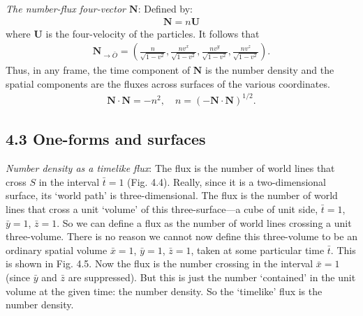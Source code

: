 \documentclass[12pt]{book}
\begin{document}
    \textit{The number-flux four-vector $\mathbf{N}$}: 
    Defined by:
    \begin{align}
        \mathbf{N}=n\mathbf{U} \tag{4.4}
    \end{align}
    where \(\mathbf{U}\) is the four-velocity of the particles. It follows that
    \begin{align}
    \mathbf{N}_{\rightarrow \bar{O}} =
    \left(
    \frac{n}{\sqrt{1 - v^2}},
    \frac{n v^x}{\sqrt{1 - v^2}},
    \frac{n v^y}{\sqrt{1 - v^2}},
    \frac{n v^z}{\sqrt{1 - v^2}}
    \right).
    \tag{4.5}
    \end{align}
    Thus, in any frame, the time component of $\mathbf{N}$ is the number density and the spatial components are the fluxes across surfaces of the various coordinates.
    \begin{align}
    \mathbf{N} \cdot \mathbf{N} = -n^2, \quad n = \left(-\mathbf{N} \cdot \mathbf{N}\right)^{1/2}.     \tag{4.6}
    \end{align}

    \subsection{4.3 One-forms and surfaces}

    \textit{Number density as a timelike flux}: 
    The flux is the number of world lines that cross \(S\) in the interval \(\bar{t} = 1\) (Fig. 4.4). Really, since it is a two-dimensional surface, its ‘world path’ is three-dimensional. The flux is the number of world lines that cross a unit ‘volume’ of this three-surface—a cube of unit side, \(\bar{t} = 1\), \(\bar{y} = 1\), \(\bar{z} = 1\). So we can define a flux as the number of world lines crossing a unit three-volume. There is no reason we cannot now define this three-volume to be an ordinary spatial volume \(\bar{x} = 1\), \(\bar{y} = 1\), \(\bar{z} = 1\), taken at some particular time \(\bar{t}\). This is shown in Fig. 4.5. Now the flux is the number crossing in the interval \(\bar{x} = 1\) (since \(\bar{y}\) and \(\bar{z}\) are suppressed). But this is just the number ‘contained’ in the unit volume at the given time: the number density. So the ‘timelike’ flux is the number density.
\end{document}
